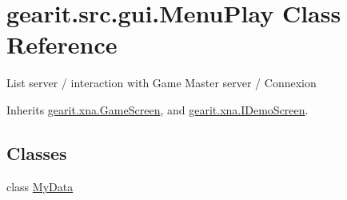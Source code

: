 \hypertarget{classgearit_1_1src_1_1gui_1_1_menu_play}{\section{gearit.\+src.\+gui.\+Menu\+Play Class Reference}
\label{classgearit_1_1src_1_1gui_1_1_menu_play}
}


List server / interaction with Game Master server / Connexion  




Inherits \hyperlink{classgearit_1_1xna_1_1_game_screen}{gearit.\+xna.\+Game\+Screen}, and \hyperlink{interfacegearit_1_1xna_1_1_i_demo_screen}{gearit.\+xna.\+I\+Demo\+Screen}.

\subsection*{Classes}
\begin{DoxyCompactItemize}
\item 
class \hyperlink{classgearit_1_1src_1_1gui_1_1_menu_play_1_1_my_data}{My\+Data}
\end{DoxyCompactItemize}
